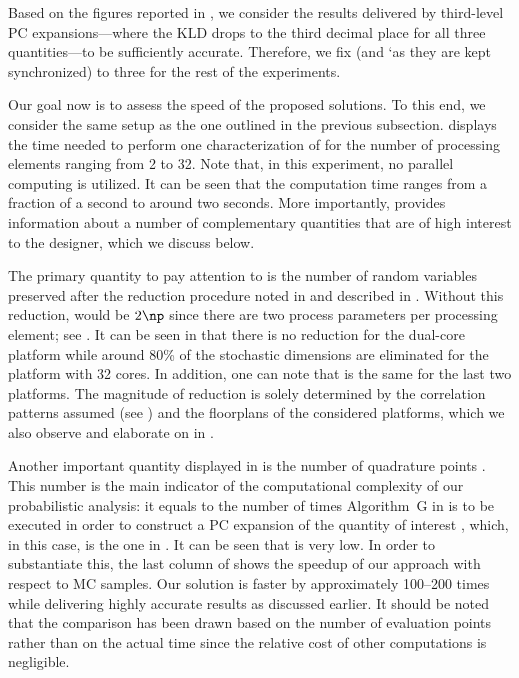 Based on the figures reported in , we consider
the results delivered by third-level \ac{PC} expansions---where the \ac{KLD}
drops to the third decimal place for all three quantities---to be sufficiently
accurate. Therefore, we fix \lc (and \lq as they are kept synchronized) to three
for the rest of the experiments.


Our goal now is to assess the speed of the proposed solutions. To this end, we
consider the same setup as the one outlined in the previous subsection.
 displays the time needed to perform one
characterization of \vg for the number of processing elements \np ranging from 2
to 32. Note that, in this experiment, no parallel computing is utilized. It can
be seen that the computation time ranges from a fraction of a second to around
two seconds. More importantly,  provides
information about a number of complementary quantities that are of high interest
to the designer, which we discuss below.

The primary quantity to pay attention to is the number of random variables \nz
preserved after the reduction procedure noted in  and
described in . Without this reduction, \nz
would be $2 \np$ since there are two process parameters per processing element;
see . It can be seen in
 that there is no reduction for the dual-core
platform while around 80\% of the stochastic dimensions are eliminated for the
platform with 32 cores. In addition, one can note that \nz is the same for the
last two platforms. The magnitude of reduction is solely determined by the
correlation patterns assumed (see ) and the
floorplans of the considered platforms, which we also observe and elaborate on
in .

Another important quantity displayed in  is the
number of quadrature points \nq. This number is the main indicator of the
computational complexity of our probabilistic analysis: it equals to the number
of times Algorithm~G in  is to be executed in order to
construct a \ac{PC} expansion of the quantity of interest \g, which, in this
case, is the one in . It can be seen that \nq
is very low. In order to substantiate this, the last column of
 shows the speedup of our approach with respect
to  \ac{MC} samples. Our solution is faster by approximately
100--200 times while delivering highly accurate results as discussed earlier. It
should be noted that the comparison has been drawn based on the number of
evaluation points rather than on the actual time since the relative cost of
other computations is negligible.

